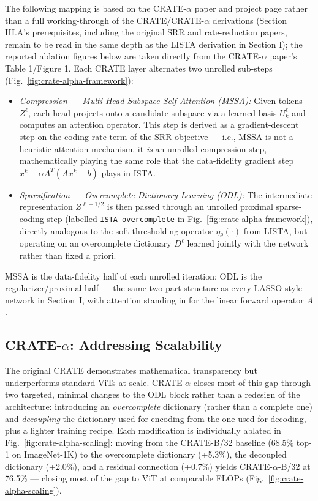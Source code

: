 \documentclass[conference]{IEEEtran}
\begin{document}
The following mapping is based on the CRATE-$\alpha$ paper and project page rather than a full working-through of the CRATE/CRATE-$\alpha$ derivations (Section III.A's prerequisites, including the original SRR and rate-reduction papers, remain to be read in the same depth as the LISTA derivation in Section I); the reported ablation figures below are taken directly from the CRATE-$\alpha$ paper's Table 1/Figure 1. Each CRATE layer alternates two unrolled sub-steps (Fig.~\ref{fig:crate-alpha-framework}):
\begin{itemize}
    \item[$\bullet$] \textit{Compression — Multi-Head Subspace Self-Attention (MSSA):} Given tokens $Z^\ell$, each head projects onto a candidate subspace via a learned basis $U_k^\ell$ and computes an attention operator. This step is derived as a gradient-descent step on the coding-rate term of the SRR objective — i.e., MSSA is not a heuristic attention mechanism, it \textit{is} an unrolled compression step, mathematically playing the same role that the data-fidelity gradient step $x^k - \alpha A^T(Ax^k - b)$ plays in ISTA.
    \item[$\bullet$] \textit{Sparsification — Overcomplete Dictionary Learning (ODL):} The intermediate representation $Z^{\ell+1/2}$ is then passed through an unrolled proximal sparse-coding step (labelled \texttt{ISTA-overcomplete} in Fig.~\ref{fig:crate-alpha-framework}), directly analogous to the soft-thresholding operator $\eta_\theta(\cdot)$ from LISTA, but operating on an overcomplete dictionary $D^\ell$ learned jointly with the network rather than fixed a priori.
\end{itemize}

MSSA is the data-fidelity half of each unrolled iteration; ODL is the regularizer/proximal half — the same two-part structure as every LASSO-style network in Section~I, with attention standing in for the linear forward operator $A$.

\subsection{\texorpdfstring{CRATE-$\alpha$}{CRATE-alpha}: Addressing Scalability}
The original CRATE demonstrates mathematical transparency but underperforms standard ViTs \cite{dosovitskiy2020image} at scale. CRATE-$\alpha$ closes most of this gap through two targeted, minimal changes to the ODL block rather than a redesign of the architecture: introducing an \textit{overcomplete} dictionary (rather than a complete one) and \textit{decoupling} the dictionary used for encoding from the one used for decoding, plus a lighter training recipe. Each modification is individually ablated in Fig.~\ref{fig:crate-alpha-scaling}: moving from the CRATE-B/32 baseline (68.5\% top-1 on ImageNet-1K) to the overcomplete dictionary (+5.3\%), the decoupled dictionary (+2.0\%), and a residual connection (+0.7\%) yields CRATE-$\alpha$-B/32 at 76.5\% — closing most of the gap to ViT at comparable FLOPs (Fig.~\ref{fig:crate-alpha-scaling}).
\end{document}
